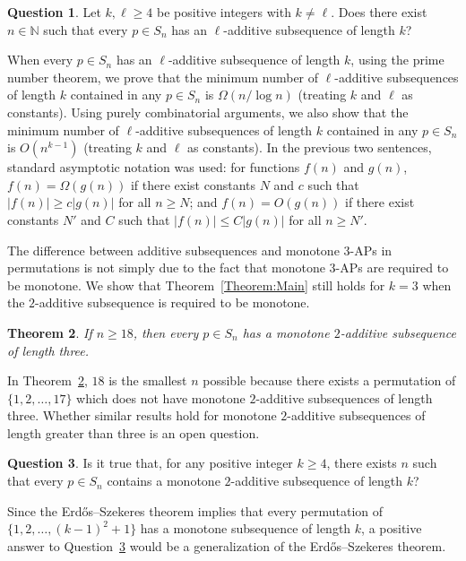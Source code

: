 \documentclass[11pt]{article}
\newtheorem{theorem}{Theorem}[section]
\theoremstyle{definition}
\newtheorem{problem}[theorem]{Question}
\begin{document}
\begin{problem}\label{Problem:l-Additive}
    Let $k,\ell\geq4$ be positive integers with $k\neq\ell$. Does there exist $n\in\mathbb{N}$ such that every $p\in S_n$ has an $\ell$-additive subsequence of length $k$?
\end{problem}
When every $p\in S_n$ has an $\ell$-additive subsequence of length $k$, using the prime number theorem, we prove that the minimum number of $\ell$-additive subsequences of length $k$ contained in any $p\in S_n$ is $\Omega(n/\log n)$ (treating $k$ and $\ell$ as constants). Using purely combinatorial arguments, we also show that the minimum number of $\ell$-additive subsequences of length $k$ contained in any $p\in S_n$ is $O(n^{k-1})$ (treating $k$ and $\ell$ as constants). In the previous two sentences, standard asymptotic notation was used: for functions $f(n)$ and $g(n)$, $f(n)=\Omega(g(n))$ if there exist constants $N$ and $c$ such that $|f(n)|\geq c|g(n)|$ for all $n\geq N$; and $f(n)=O(g(n))$ if there exist constants $N'$ and $C$ such that $|f(n)|\leq C|g(n)|$ for all $n\geq N'$.

The difference between additive subsequences and monotone 3-APs in permutations is not simply due to the fact that monotone 3-APs are required to be monotone. We show that Theorem~\ref{Theorem:Main} still holds for $k=3$ when the $2$-additive subsequence is required to be monotone.
\begin{theorem}\label{Theorem:Mon}
    If $n\geq 18$, then every $p\in S_n$ has a monotone $2$-additive subsequence of length three.
\end{theorem}
In Theorem~\ref{Theorem:Mon}, $18$ is the smallest $n$ possible because there exists a permutation of $\{1,2,\ldots,17\}$ which does not have monotone $2$-additive subsequences of length three. Whether similar results hold for monotone $2$-additive subsequences of length greater than three is an open question. 

\begin{problem}\label{Problem:Mon}
Is it true that, for any positive integer $k\geq4$, there exists $n$ such that every $p\in S_n$ contains a monotone $2$-additive subsequence of length $k$?
\end{problem}


Since the Erd\H{o}s–Szekeres theorem \cite{ErdosSzekeres1935} implies that every permutation of $\{1,2,\ldots,(k-1)^2+1\}$ has a monotone subsequence of length $k$, a positive answer to Question~\ref{Problem:Mon} would be a generalization of the Erd\H{o}s–Szekeres theorem.
\end{document}
